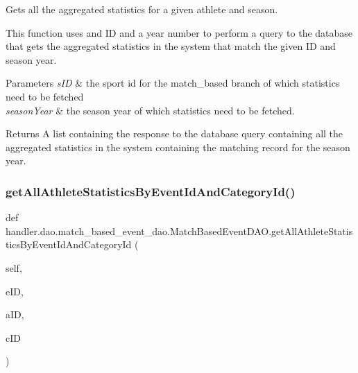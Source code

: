 Gets all the aggregated statistics for a given athlete and season. 

This function uses and ID and a year number to perform a query to the database that gets the aggregated statistics in the system that match the given ID and season year.


\begin{DoxyParams}{Parameters}
{\em s\+ID} & the sport id for the match\+\_\+based branch of which statistics need to be fetched \\
\hline
{\em season\+Year} & the season year of which statistics need to be fetched.\\
\hline
\end{DoxyParams}
\begin{DoxyReturn}{Returns}
A list containing the response to the database query containing all the aggregated statistics in the system containing the matching record for the season year. 
\end{DoxyReturn}
\mbox{\label{classhandler_1_1dao_1_1match__based__event__dao_1_1_match_based_event_d_a_o_aea8381bb1ffa889c35e082fb1819be03}} 
\subsubsection{\texorpdfstring{get\+All\+Athlete\+Statistics\+By\+Event\+Id\+And\+Category\+Id()}{getAllAthleteStatisticsByEventIdAndCategoryId()}}
{\footnotesize\ttfamily def handler.\+dao.\+match\+\_\+based\+\_\+event\+\_\+dao.\+Match\+Based\+Event\+D\+A\+O.\+get\+All\+Athlete\+Statistics\+By\+Event\+Id\+And\+Category\+Id (\begin{DoxyParamCaption}\item[{}]{self,  }\item[{}]{e\+ID,  }\item[{}]{a\+ID,  }\item[{}]{c\+ID }\end{DoxyParamCaption})}



